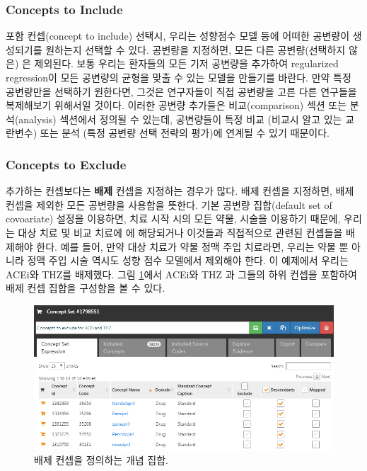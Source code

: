 \documentclass[11pt]{book}
\theoremstyle{definition}
\theoremstyle{definition}
\theoremstyle{definition}
\theoremstyle{remark}
\begin{document}
\subsubsection*{Concepts to Include}\label{concepts-to-include}

포함 컨셉(concept to include) 선택시, 우리는 성향점수 모델 등에 어떠한
공변량이 생성되기를 원하는지 선택할 수 있다. 공변량을 지정하면, 모든
다른 공변량(선택하지 않은) 은 제외된다. 보통 우리는 환자들의 모든 기저
공변량을 추가하여 regularized regression이 모든 공변량의 균형을 맞출 수
있는 모델을 만들기를 바란다. 만약 특정 공변량만을 선택하기 원한다면,
그것은 연구자들이 직접 공변량을 고른 다른 연구들을 복제해보기 위해서일
것이다. 이러한 공변량 추가들은 비교(comparison) 섹션 또는 분석(analysis)
섹션에서 정의될 수 있는데, 공변량들이 특정 비교 (비교시 알고 있는
교란변수) 또는 분석 (특정 공변량 선택 전략의 평가)에 연계될 수 있기
때문이다.

\subsubsection*{Concepts to Exclude}\label{concepts-to-exclude}

추가하는 컨셉보다는 \textbf{배제} 컨셉을 지정하는 경우가 많다. 배제
컨셉을 지정하면, 배제 컨셉을 제외한 모든 공변량을 사용함을 뜻한다. 기본
공변량 집합(default set of covoariate) 설정을 이용하면, 치료 시작 시의
모든 약물, 시술을 이용하기 때문에, 우리는 대상 치료 및 비교 치료에 에
해당되거나 이것들과 직접적으로 관련된 컨셉들을 배제해야 한다. 예를 들어,
만약 대상 치료가 약물 정맥 주입 치료라면, 우리는 약물 뿐 아니라 정맥
주입 시술 역시도 성향 점수 모델에서 제외해야 한다. 이 예제에서 우리는
ACEi와 THZ를 배제했다. 그림 \ref{fig:covsToExclude}에서 ACEi와 THZ 과
그들의 하위 컨셉을 포함하여 배제 컨셉 집합을 구성함을 볼 수 있다.

\begin{figure}

{\centering \includegraphics[width=1\linewidth]{images/PopulationLevelEstimation/covsToExclude} 

}

\caption{배제 컨셉을 정의하는 개념 집합.}\label{fig:covsToExclude}
\end{figure}
\end{document}

